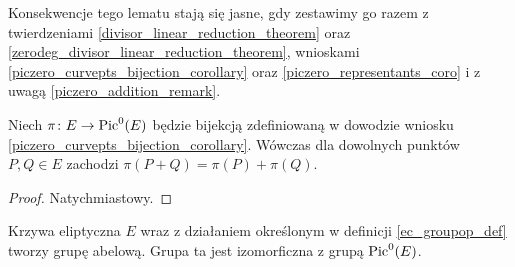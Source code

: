 Konsekwencje tego lematu stają się jasne,
gdy zestawimy go razem z twierdzeniami
\ref{divisor_linear_reduction_theorem}
oraz \ref{zerodeg_divisor_linear_reduction_theorem},
wnioskami \ref{piczero_curvepts_bijection_corollary}
oraz \ref{piczero_representants_coro}
i z uwagą \ref{piczero_addition_remark}.

\begin{theorem}
Niech $\pi \colon E \to \operatorname{Pic}^0(E)$
będzie bijekcją zdefiniowaną w dowodzie wniosku
\ref{piczero_curvepts_bijection_corollary}.
Wówczas dla dowolnych punktów $P, Q \in E$
zachodzi $\pi(P + Q) = \pi(P) + \pi(Q)$.
\end{theorem}

\begin{proof}
Natychmiastowy.
\end{proof}

\begin{corollary}
Krzywa eliptyczna $E$ wraz z działaniem określonym w definicji
\ref{ec_groupop_def} tworzy grupę abelową.
Grupa ta jest izomorficzna z grupą $\operatorname{Pic}^0(E)$.
\end{corollary}
